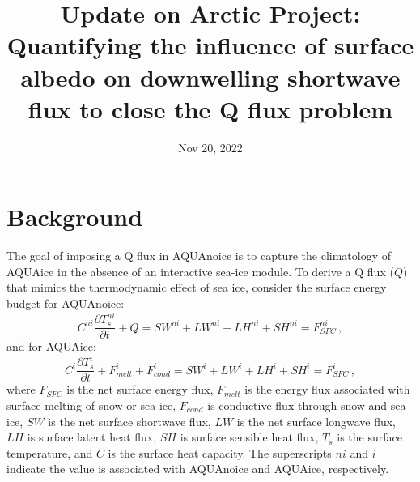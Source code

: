 \documentclass{article}
\title{Update on Arctic Project:\\Quantifying the influence of surface albedo on downwelling shortwave flux to close the Q flux problem}
\date{Nov 20, 2022}
\begin{document}
\maketitle

\section{Background}
The goal of imposing a Q flux in AQUAnoice is to capture the climatology of AQUAice in the absence of an interactive sea-ice module. To derive a Q flux ($Q$) that mimics the thermodynamic effect of sea ice, consider the surface energy budget for AQUAnoice:
\begin{equation}\label{eq:fsfc-ni}
    C^{ni}\frac{\partial T^{ni}_{s}}{\partial t} + Q = SW^{ni} + LW^{ni} + LH^{ni} + SH^{ni} = F^{ni}_{SFC} \, ,
\end{equation}
and for AQUAice:
\begin{equation}\label{eq:fsfc-i}
    C^i\frac{\partial T^{i}_{s}}{\partial t} + F^i_{melt} + F^i_{cond}  = SW^{i} + LW^{i} + LH^{i} + SH^{i} = F^i_{SFC} \, ,
\end{equation}
where $F_{SFC}$ is the net surface energy flux, $F_{melt}$ is the energy flux associated with surface melting of snow or sea ice, $F_{cond}$ is conductive flux through snow and sea ice, $SW$ is the net surface shortwave flux, $LW$ is the net surface longwave flux, $LH$ is surface latent heat flux, $SH$ is surface sensible heat flux, $T_{s}$ is the surface temperature, and $C$ is the surface heat capacity. The superscripts $ni$ and $i$ indicate the value is associated with AQUAnoice and AQUAice, respectively.
\end{document}
